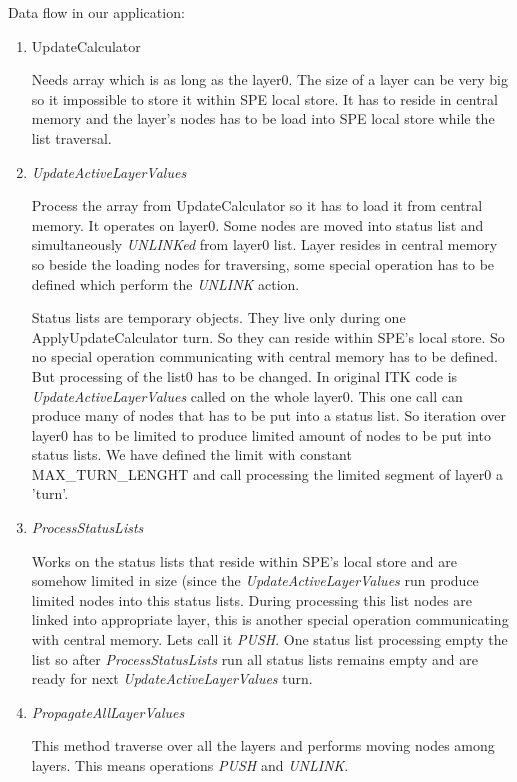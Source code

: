 Data flow in our application:
\begin{enumerate}
\item UpdateCalculator
\par
Needs array which is as long as the layer0.
The size of a layer can be very big so it impossible to store it within SPE local store.
It has to reside in central memory and the layer's nodes has to be load into SPE local store while the list traversal.

\item \emph{UpdateActiveLayerValues}
\par
Process the array from UpdateCalculator so it has to load it from central memory.
It operates on layer0.
Some nodes are moved into status list and simultaneously \emph{UNLINKed} from layer0 list.
Layer resides in central memory so beside the loading nodes for traversing, some special operation has to be defined which perform the \emph{UNLINK} action.
\par
Status lists are temporary objects. They live only during one ApplyUpdateCalculator turn.
So they can reside within SPE's local store.
So no special operation communicating with central memory has to be defined.
But processing of the list0 has to be changed.
In original ITK code is \emph{UpdateActiveLayerValues} called on the whole layer0.
This one call can produce many of nodes that has to be put into a status list.
So iteration over layer0 has to be limited to produce limited amount of nodes to be put into status lists.
We have defined the limit with constant MAX\_TURN\_LENGHT and call processing the limited segment of layer0 a 'turn'.

\item \emph{ProcessStatusLists}
\par
Works on the status lists that reside within SPE's local store and are somehow limited in size (since the \emph{UpdateActiveLayerValues} run produce limited nodes into this status lists.
During processing this list nodes are linked into appropriate layer, this is another special operation communicating with central memory.
Lets call it \emph{PUSH}.
One status list processing empty the list so after \emph{ProcessStatusLists} run all status lists remains empty and are ready for next \emph{UpdateActiveLayerValues} turn.

\item \emph{PropagateAllLayerValues}
\par
This method traverse over all the layers and performs moving nodes among layers.
This means operations \emph{PUSH} and \emph{UNLINK}.
\end{enumerate}

